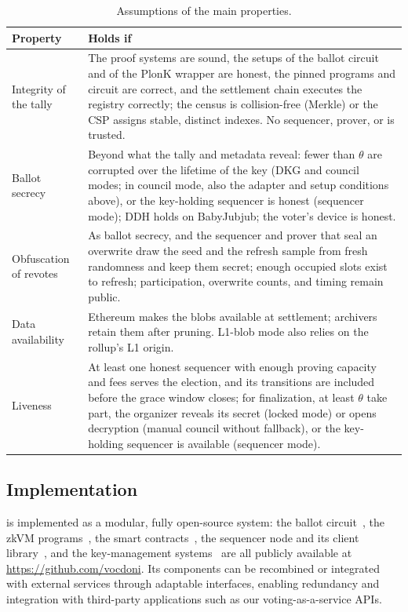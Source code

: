 \begin{table}[h]
	\centering
	\caption{Assumptions of the main properties.}
	\label{tab:trust}
	\small
	\begin{tabular}{>{\raggedright\arraybackslash}p{} >{\raggedright\arraybackslash}p{}}
		\toprule
		\textbf{Property} & \textbf{Holds if} \\
		\midrule
		Integrity of the tally & The proof systems are sound, the setups of the ballot circuit and of the PlonK wrapper are honest, the pinned programs and circuit are correct, and the settlement chain executes the registry correctly; the census is collision-free (Merkle) or the \ac{CSP} assigns stable, distinct indexes. No sequencer, prover, or \keywarden is trusted. \\
		Ballot secrecy & Beyond what the tally and metadata reveal: fewer than $\theta$ \keywardens are corrupted over the lifetime of the key (\ac{DKG} and council modes; in council mode, also the adapter and setup conditions above), or the key-holding sequencer is honest (sequencer mode); DDH holds on BabyJubjub; the voter's device is honest. \\
		Obfuscation of revotes & As ballot secrecy, and the sequencer and prover that seal an overwrite draw the seed and the refresh sample from fresh randomness and keep them secret; enough occupied slots exist to refresh; participation, overwrite counts, and timing remain public. \\
		Data availability & Ethereum makes the blobs available at settlement; archivers retain them after pruning. L1-blob mode also relies on the rollup's L1 origin. \\
		Liveness & At least one honest sequencer with enough proving capacity and fees serves the election, and its transitions are included before the grace window closes; for finalization, at least $\theta$ \keywardens take part, the organizer reveals its secret (locked mode) or opens decryption (manual council without fallback), or the key-holding sequencer is available (sequencer mode). \\
		\bottomrule
	\end{tabular}
\end{table}

\subsection{Implementation}
\label{sec:analysis:implementation}

\Davinci is implemented as a modular, fully open-source system: the ballot circuit~\cite{davinci-circom}, the \ac{zkVM} programs~\cite{davinci-zkvm}, the smart contracts~\cite{davinci-contracts}, the sequencer node and its client library~\cite{davinci-sequencer}, and the key-management systems~\cite{davinci-dkg,davinci-council} are all publicly available at \url{https://github.com/vocdoni}. Its components can be recombined or integrated with external services through adaptable interfaces, enabling redundancy and integration with third-party applications such as our voting-as-a-service APIs.

